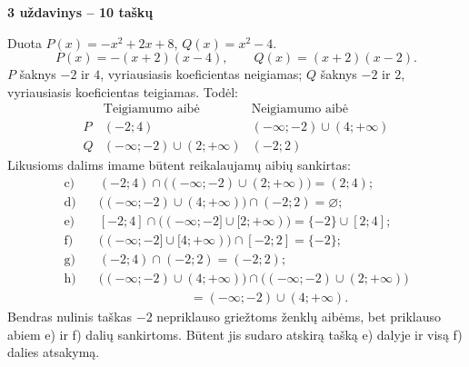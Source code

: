 \documentclass[11pt]{article}
\newcommand{\sk}[1]{\par\medskip\textbf{#1}\par}
\begin{document}
\sk{3 uždavinys -- 10 taškų}
Duota $P(x)=- x^{2} + 2 x + 8$, $Q(x)=x^{2} - 4$.
\[P(x)=-(x+2)(x-4),\qquad Q(x)=(x+2)(x-2).\]
$P$ šaknys $-2$ ir $4$, vyriausiasis koeficientas neigiamas; $Q$ šaknys $-2$ ir $2$, vyriausiasis koeficientas teigiamas. Todėl:
\[\begin{array}{lll} &\text{Teigiamumo aibė}&\text{Neigiamumo aibė}\\
P&(-2;4)&(-\infty;-2)\cup(4;+\infty)\\
Q&(-\infty;-2)\cup(2;+\infty)&(-2;2)
\end{array}\]
Likusioms dalims imame būtent reikalaujamų aibių sankirtas:
\begin{align*}
\text{c)}\quad &(-2;4)\cap\bigl((-\infty;-2)\cup(2;+\infty)\bigr)=(2;4);\\
\text{d)}\quad &\bigl((-\infty;-2)\cup(4;+\infty)\bigr)\cap(-2;2)=\varnothing;\\
\text{e)}\quad &[-2;4]\cap\bigl((-\infty;-2]\cup[2;+\infty)\bigr)=\{-2\}\cup[2;4];\\
\text{f)}\quad &\bigl((-\infty;-2]\cup[4;+\infty)\bigr)\cap[-2;2]=\{-2\};\\
\text{g)}\quad &(-2;4)\cap(-2;2)=(-2;2);\\
\text{h)}\quad &\bigl((-\infty;-2)\cup(4;+\infty)\bigr)\cap\bigl((-\infty;-2)\cup(2;+\infty)\bigr)\\
&\hspace{3cm}=(-\infty;-2)\cup(4;+\infty).
\end{align*}
Bendras nulinis taškas $-2$ nepriklauso griežtoms ženklų aibėms, bet priklauso abiem e) ir f) dalių sankirtoms. Būtent jis sudaro atskirą tašką e) dalyje ir visą f) dalies atsakymą.
\end{document}
